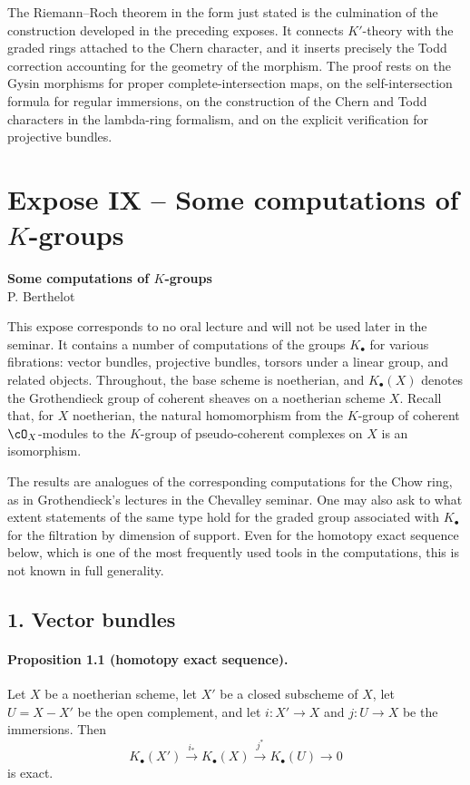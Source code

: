 \documentclass[11pt]{article}
\theoremstyle{plain}
\theoremstyle{definition}
\theoremstyle{remark}
\newcommand{\longto}{\longrightarrow}
\providecommand{\xto}[1]{\xrightarrow{#1}}
\begin{document}
The Riemann--Roch theorem in the form just stated is the culmination of the construction developed in the preceding exposes. It connects $K'$-theory with the graded rings attached to the Chern character, and it inserts precisely the Todd correction accounting for the geometry of the morphism. The proof rests on the Gysin morphisms for proper complete-intersection maps, on the self-intersection formula for regular immersions, on the construction of the Chern and Todd characters in the lambda-ring formalism, and on the explicit verification for projective bundles.

\section*{Expose IX -- Some computations of $K$-groups}

\begin{center}
{\large\textbf{Some computations of $K$-groups}}\\[0.25em]
{\normalsize P. Berthelot}
\end{center}

This expose corresponds to no oral lecture and will not be used later in the seminar. It contains a number of computations of the groups $K_\bullet$ for various fibrations: vector bundles, projective bundles, torsors under a linear group, and related objects. Throughout, the base scheme is noetherian, and $K_\bullet(X)$ denotes the Grothendieck group of coherent sheaves on a noetherian scheme $X$. Recall that, for $X$ noetherian, the natural homomorphism from the $K$-group of coherent $\cO_X$-modules to the $K$-group of pseudo-coherent complexes on $X$ is an isomorphism.

The results are analogues of the corresponding computations for the Chow ring, as in Grothendieck's lectures in the Chevalley seminar. One may also ask to what extent statements of the same type hold for the graded group associated with $K_\bullet$ for the filtration by dimension of support. Even for the homotopy exact sequence below, which is one of the most frequently used tools in the computations, this is not known in full generality.

\subsection*{1. Vector bundles}

\paragraph{Proposition 1.1 (homotopy exact sequence).}
Let $X$ be a noetherian scheme, let $X'$ be a closed subscheme of $X$, let $U=X-X'$ be the open complement, and let $i:X'\to X$ and $j:U\to X$ be the immersions. Then
\[
K_\bullet(X')\xto{\,i_*\,}K_\bullet(X)\xto{\,j^*\,}K_\bullet(U)\longto0
\]
is exact.
\end{document}

